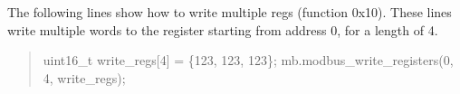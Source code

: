 \begin{DoxyEnumerate}
\item The following lines show how to write multiple regs (function 0x10). These lines write multiple words to the register starting from address 0, for a length of 4. \begin{quote}
uint16\+\_\+t write\+\_\+regs\mbox{[}4\mbox{]} = \{123, 123, 123\}; mb.\+modbus\+\_\+write\+\_\+registers(0, 4, write\+\_\+regs);\end{quote}

\end{DoxyEnumerate}